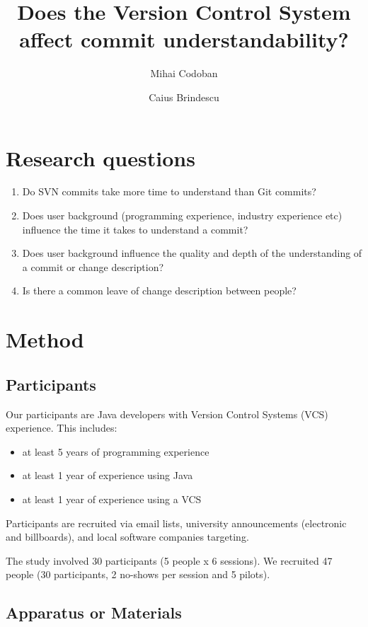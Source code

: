 \documentclass[letterpaper]{article}
\title{Does the Version Control System affect commit understandability?}
\author{Mihai Codoban \and Caius Brindescu}
\date{}
\begin{document}
\maketitle

\section{Research questions}

\begin{enumerate}
	\item Do SVN commits take more time to understand than Git commits?
	\item Does user background (programming experience, industry experience etc) influence the time it takes to understand a commit?
	\item Does user background influence the quality and depth of the understanding of a commit or change description?
	\item Is there a common leave of change description between people?
\end{enumerate}

\section{Method}

\subsection{Participants}

Our participants are Java developers with Version Control Systems (VCS) experience. 
This includes:
\begin{itemize}
	\item at least 5 years of programming experience
	\item at least 1 year of experience using Java
	\item at least 1 year of experience using a VCS
\end{itemize}

Participants are recruited via email lists, university announcements (electronic and billboards), and local software companies targeting.

The study involved 30 participants (5 people x 6 sessions). 
We recruited 47 people (30 participants, 2 no-shows per session and 5 pilots).

\subsection{Apparatus or Materials}
\label{apparatus}
\end{document}
